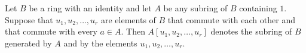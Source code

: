 Let $B$ be a ring with an identity and let $A$ be any subring of $B$ containing $1$. Suppose that $u_1, u_2, \dots, u_r$ are elements of $B$ that commute with each other and that commute with every $a \in A$. Then $A[u_1, u_2, \dots, u_r]$ denotes the subring of $B$ generated by $A$ and by the elements $u_1, u_2, \dots, u_r$.
